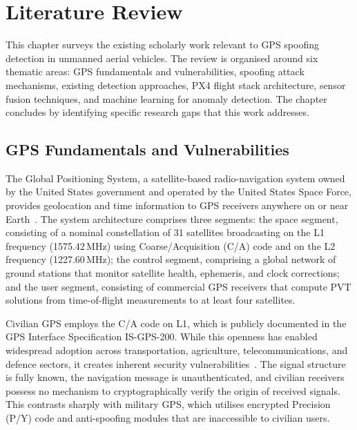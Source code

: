 \chapter{Literature Review}

This chapter surveys the existing scholarly work relevant to GPS spoofing detection in unmanned aerial vehicles. The review is organised around six thematic areas: GPS fundamentals and vulnerabilities, spoofing attack mechanisms, existing detection approaches, PX4 flight stack architecture, sensor fusion techniques, and machine learning for anomaly detection. The chapter concludes by identifying specific research gaps that this work addresses.

\section{GPS Fundamentals and Vulnerabilities}

The Global Positioning System, a satellite-based radio-navigation system owned by the United States government and operated by the United States Space Force, provides geolocation and time information to GPS receivers anywhere on or near Earth~\cite{Shah2022}. The system architecture comprises three segments: the space segment, consisting of a nominal constellation of 31 satellites broadcasting on the L1 frequency (1575.42\,MHz) using Coarse/Acquisition (C/A) code and on the L2 frequency (1227.60\,MHz); the control segment, comprising a global network of ground stations that monitor satellite health, ephemeris, and clock corrections; and the user segment, consisting of commercial GPS receivers that compute PVT solutions from time-of-flight measurements to at least four satellites.

Civilian GPS employs the C/A code on L1, which is publicly documented in the GPS Interface Specification IS-GPS-200. While this openness has enabled widespread adoption across transportation, agriculture, telecommunications, and defence sectors, it creates inherent security vulnerabilities~\cite{Schmidt2021}. The signal structure is fully known, the navigation message is unauthenticated, and civilian receivers possess no mechanism to cryptographically verify the origin of received signals. This contrasts sharply with military GPS, which utilises encrypted Precision (P/Y) code and anti-spoofing modules that are inaccessible to civilian users.

